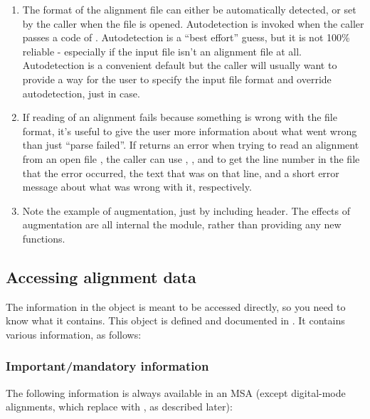 \begin{enumerate}
\item The format of the alignment file can either be automatically
      detected, or set by the caller when the file is opened.
      Autodetection is invoked when the caller passes a 
      code of . Autodetection is a ``best
      effort'' guess, but it is not 100\% reliable - especially if the
      input file isn't an alignment file at all. Autodetection is a
      convenient default but the caller will usually want to provide a
      way for the user to specify the input file format and override
      autodetection, just in case.

\item If reading of an alignment fails because something is wrong with
      the file format, it's useful to give the user more information
      about what went wrong than just ``parse failed''. If
       returns an  error
      when trying to read an alignment from an open file ,
      the caller can use , ,
      and  to get the line number in the file that
      the error occurred, the text that was on that line, and a short
      error message about what was wrong with it, respectively.

\item Note the example of  augmentation, just by
      including  header. The effects of
       augmentation are all internal the 
      module, rather than providing any new functions.
\end{enumerate}

\subsection{Accessing alignment data}

The information in the  object is meant to be accessed
directly, so you need to know what it contains. This object is defined
and documented in . It contains various information,
as follows:

\subsubsection{Important/mandatory information}

The following information is always available in an MSA (except
digital-mode alignments, which replace  with
, as described later):

